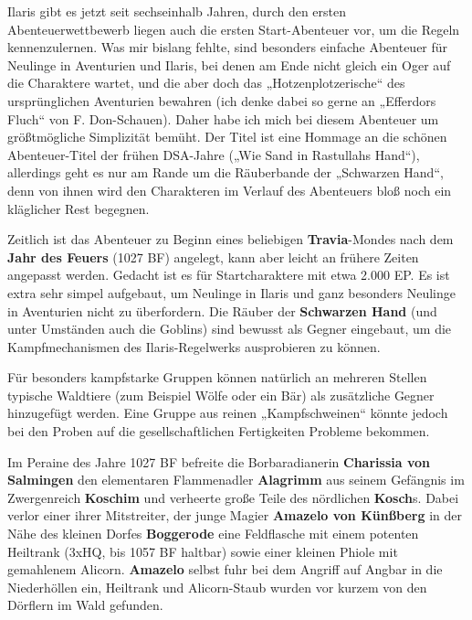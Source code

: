 \spaltenanfang

Ilaris gibt es jetzt seit sechseinhalb Jahren, durch den ersten Abenteuerwettbewerb
liegen auch die ersten Start-Abenteuer vor, um die Regeln kennenzulernen. Was mir 
bislang fehlte, sind besonders einfache Abenteuer für Neulinge in Aventurien und Ilaris, 
bei denen am Ende nicht gleich ein Oger auf die Charaktere wartet, und die aber doch das 
„Hotzenplotzerische“ des ursprünglichen Aventurien bewahren (ich denke dabei so gerne an
„Efferdors Fluch“ von F. Don-Schauen). Daher habe ich mich bei diesem Abenteuer um
größtmögliche Simplizität bemüht. Der Titel ist eine Hommage an die schönen Abenteuer-Titel 
der frühen DSA-Jahre („Wie Sand in Rastullahs Hand“), allerdings geht es nur am Rande um die 
Räuberbande der „Schwarzen Hand“, denn von ihnen wird den Charakteren im Verlauf des Abenteuers 
bloß noch ein kläglicher Rest begegnen.


Zeitlich ist das Abenteuer zu Beginn eines beliebigen \textbf{Travia}-Mondes nach dem \textbf{Jahr des Feuers} (1027 BF)
angelegt, kann aber leicht an frühere Zeiten angepasst werden. 
Gedacht ist es für Startcharaktere mit etwa 2.000 EP. 
Es ist extra sehr simpel aufgebaut, um Neulinge in Ilaris und ganz besonders Neulinge in Aventurien 
nicht zu überfordern. Die Räuber der \textbf{Schwarzen Hand} (und unter Umständen auch die Goblins) sind  bewusst als 
Gegner eingebaut, um die Kampfmechanismen des Ilaris-Regelwerks ausprobieren zu können. 

Für besonders kampfstarke Gruppen können natürlich an mehreren Stellen typische Waldtiere 
(zum Beispiel Wölfe oder ein Bär) als zusätzliche Gegner hinzugefügt werden. Eine Gruppe aus reinen 
„Kampfschweinen“ könnte jedoch bei den Proben auf die gesellschaftlichen Fertigkeiten Probleme bekommen.


\neuespalte

Im Peraine des Jahre 1027 BF befreite die Borbaradianerin \textbf{Charissia von Salmingen} den elementaren Flammenadler \textbf{Alagrimm} aus seinem Gefängnis im Zwergenreich \textbf{Koschim} und verheerte große Teile des nördlichen \textbf{Kosch}s.
Dabei verlor einer ihrer Mitstreiter, der junge Magier \textbf{Amazelo von Künßberg} in der Nähe des kleinen Dorfes \textbf{Boggerode} eine Feldflasche mit einem potenten Heiltrank (3xHQ, bis 1057 BF haltbar) sowie einer kleinen Phiole mit gemahlenem Alicorn.
\textbf{Amazelo} selbst fuhr bei dem Angriff auf Angbar in die Niederhöllen ein, Heiltrank und Alicorn-Staub wurden vor kurzem von den Dörflern im Wald gefunden.

